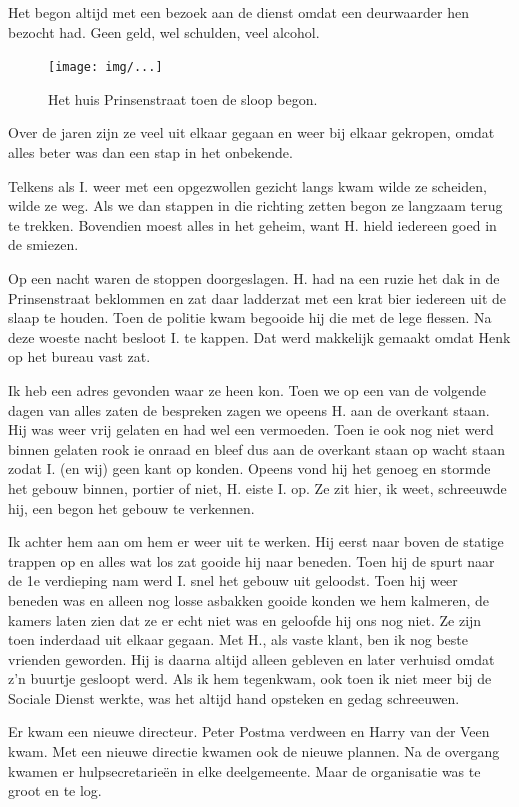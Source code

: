 \documentclass[12pt,twoside]{memoir}
\begin{document}
Het begon altijd met een bezoek aan de dienst omdat een deurwaarder hen bezocht had. Geen geld, wel schulden, veel alcohol.

\begin{figure}[t]
\texttt{[image: img/...]}
\caption{Het huis Prinsenstraat toen de sloop begon.}
\end{figure}

Over de jaren zijn ze veel uit elkaar gegaan en weer bij elkaar gekropen, omdat alles beter was dan een stap in het onbekende. 

Telkens als I. weer met een opgezwollen gezicht langs kwam wilde ze scheiden, wilde ze weg. Als we dan stappen in die richting zetten begon ze langzaam terug te trekken. Bovendien moest alles in het geheim, want H. hield iedereen goed in de smiezen. 

Op een nacht waren de stoppen doorgeslagen. H. had na een ruzie het dak in de Prinsenstraat beklommen en zat daar ladderzat met een krat bier iedereen uit de slaap te houden. Toen de politie kwam begooide hij die met de lege flessen. Na deze woeste nacht besloot I. te kappen. Dat werd makkelijk gemaakt omdat Henk op het bureau vast zat. 

Ik heb een adres gevonden waar ze heen kon. Toen we op een van de volgende dagen van alles zaten de bespreken zagen we opeens H. aan de overkant staan. Hij was weer vrij gelaten en had wel een vermoeden. Toen ie ook nog niet werd binnen gelaten rook ie onraad en bleef dus aan de overkant staan op wacht staan zodat I. (en wij) geen kant op konden. Opeens vond hij het genoeg en stormde het gebouw binnen, portier of niet, H. eiste I. op. Ze zit hier, ik weet, schreeuwde hij, een begon het gebouw te verkennen. 

Ik achter hem aan om hem er weer uit te werken. Hij eerst naar boven de statige trappen op en alles wat los zat gooide hij naar beneden. Toen hij de spurt naar de 1e verdieping nam werd I. snel het gebouw uit geloodst. Toen hij weer beneden was en alleen nog losse asbakken gooide konden we hem kalmeren, de kamers laten zien dat ze er echt niet was en geloofde hij ons nog niet. Ze zijn toen inderdaad uit elkaar gegaan. Met H., als vaste klant, ben ik nog beste vrienden geworden. Hij is daarna altijd alleen gebleven en later verhuisd omdat z’n buurtje gesloopt werd. Als ik hem tegenkwam, ook toen ik niet meer bij de Sociale Dienst werkte, was het altijd hand opsteken en gedag schreeuwen.

Er kwam een nieuwe directeur. Peter Postma verdween en Harry van der Veen kwam. Met een nieuwe directie kwamen ook de nieuwe plannen. Na de overgang kwamen er hulpsecretarieën in elke deelgemeente. Maar de organisatie was te groot en te log. 
\end{document}
